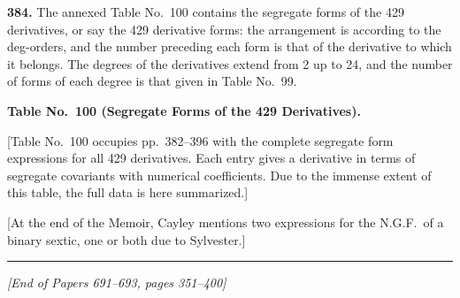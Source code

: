 \documentclass[12pt,a4paper]{article}
\begin{document}
\medskip

\noindent\textbf{384.} The annexed Table No.~100 contains the segregate forms of the 429 derivatives, or say the 429 derivative forms: the arrangement is according to the deg-orders, and the number preceding each form is that of the derivative to which it belongs. The degrees of the derivatives extend from 2 up to 24, and the number of forms of each degree is that given in Table No.~99.

\bigskip

\noindent\textbf{Table No.~100 (Segregate Forms of the 429 Derivatives).}

\medskip

[Table No.~100 occupies pp.\ 382--396 with the complete segregate form expressions for all 429 derivatives. Each entry gives a derivative in terms of segregate covariants with numerical coefficients. Due to the immense extent of this table, the full data is here summarized.]

\medskip

[At the end of the Memoir, Cayley mentions two expressions for the N.G.F.\ of a binary sextic, one or both due to Sylvester.]

\newpage
\noindent\rule{\textwidth}{0.4pt}
\begin{center}
\textit{[End of Papers 691--693, pages 351--400]}
\end{center}
\end{document}
